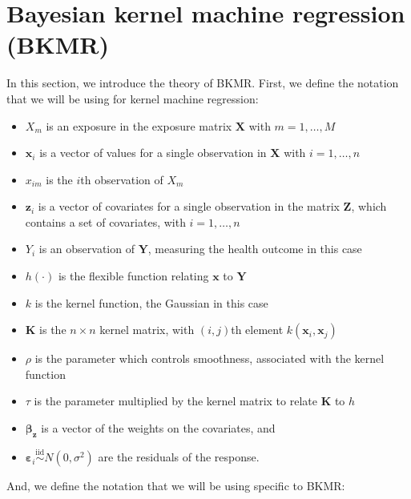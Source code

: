 \documentclass[12pt, twoside]{amherstthesis}
\providecommand{\tightlist}{%
  \setlength{\itemsep}{0pt}\setlength{\parskip}{0pt}}
\begin{document}
\hypertarget{bkmr}{%
\section{Bayesian kernel machine regression (BKMR)}\label{bkmr}}

In this section, we introduce the theory of BKMR. First, we define the notation that we will be using for kernel machine regression:
\begin{itemize}
\tightlist
\item
  \(X_m\) is an exposure in the exposure matrix \(\textbf{X}\) with \(m = 1, \dots, M\)
\item
  \(\textbf{x}_i\) is a vector of values for a single observation in \(\textbf{X}\) with \(i = 1, \dots, n\)
\item
  \(x_{im}\) is the \(i\)th observation of \(X_m\)
\item
  \(\textbf{z}_i\) is a vector of covariates for a single observation in the matrix \(\textbf{Z}\), which contains a set of covariates, with \(i = 1, \dots, n\)
\item
  \(Y_i\) is an observation of \(\textbf{Y}\), measuring the health outcome in this case
\item
  \(h(\cdot)\) is the flexible function relating \(\textbf{x}\) to \(\textbf{Y}\)
\item
  \(k\) is the kernel function, the Gaussian in this case
\item
  \(\textbf{K}\) is the \(n \times n\) kernel matrix, with \((i, j)\)th element \(k(\textbf{x}_i, \textbf{x}_j)\)
\item
  \(\rho\) is the parameter which controls smoothness, associated with the kernel function
\item
  \(\tau\) is the parameter multiplied by the kernel matrix to relate \(\textbf{K}\) to \(h\)
\item
  \(\boldsymbol{\beta}_{\textbf{z}}\) is a vector of the weights on the covariates, and
\item
  \(\boldsymbol\varepsilon_i \overset{\mathrm{iid}}{\sim} N(0, \sigma^2)\) are the residuals of the response.
\end{itemize}
And, we define the notation that we will be using specific to BKMR:
\end{document}
